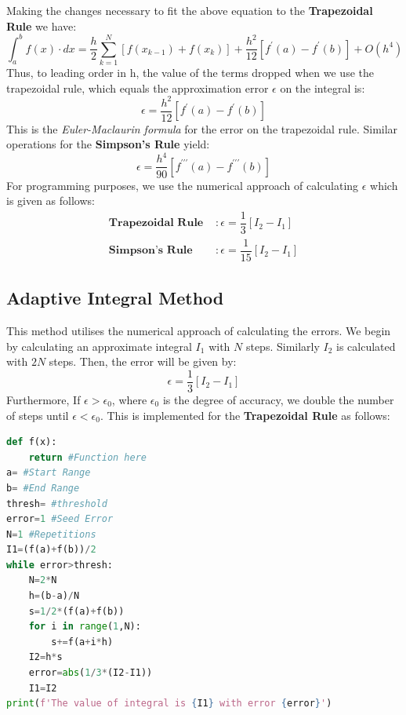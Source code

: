 \par Making the changes necessary to fit the above equation to the \textbf{Trapezoidal Rule} we have:
\[\int_{a}^{b}f(x)\cdot dx = \dfrac{h}{2}\sum_{k=1}^{N}[f(x_{k-1})+f(x_{k})]+\dfrac{h^{2}}{12}[f^{'}(a)-f^{'}(b)] +O(h^{4})
\]
Thus, to leading order in h, the value of the terms dropped when we use the trapezoidal rule, which equals the approximation error $\epsilon$ on the integral is:
\[ \epsilon=\dfrac{h^{2}}{12}[f^{'}(a)-f^{'}(b)]\]
This is the \textit{Euler-Maclaurin formula} for the error on the trapezoidal rule. Similar operations for the \textbf{Simpson's Rule} yield:
\[ \epsilon=\dfrac{h^{4}}{90}[f^{\prime\prime\prime}(a)-f^{\prime\prime\prime}(b)] \]
For programming purposes, we use the numerical approach of calculating $\epsilon$ which is given as follows:
\[\begin{split}
\textbf{Trapezoidal Rule }&: \epsilon=\dfrac{1}{3}[I_{2}-I_{1}] \\
\textbf{Simpson's Rule }&: \epsilon=\dfrac{1}{15}[I_{2}-I_{1}]
 \end{split}
 \]

\subsection{Adaptive Integral Method}
\label{subsec:3.4}
This method utilises the numerical approach of calculating the errors. We begin by calculating an approximate integral $I_{1}$ with $N$ steps. Similarly $I_{2}$ is calculated with $2N$ steps. Then, the error will be given by:$$\epsilon=\dfrac{1}{3}[I_{2}-I_{1}]$$ Furthermore, If $\epsilon>\epsilon_{0}$, where $\epsilon_{0}$ is the degree of accuracy, we double the number of steps until $\epsilon<\epsilon_{0}$. This is implemented for the \textbf{Trapezoidal Rule} as follows:
\begin{lstlisting}[language=Python, caption=Adaptive Rule, frame=single, label={lst:L7} ]
def f(x):
	return #Function here
a= #Start Range
b= #End Range
thresh= #threshold
error=1 #Seed Error
N=1 #Repetitions
I1=(f(a)+f(b))/2
while error>thresh:
	N=2*N
	h=(b-a)/N
	s=1/2*(f(a)+f(b))
	for i in range(1,N):
		s+=f(a+i*h)
	I2=h*s
	error=abs(1/3*(I2-I1))
	I1=I2
print(f'The value of integral is {I1} with error {error}')
\end{lstlisting}
\newpage
